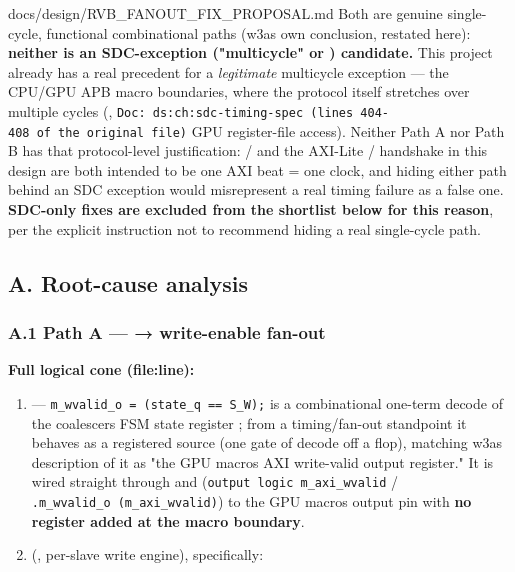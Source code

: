 \begin{relocated}{docs/design/RVB_FANOUT_FIX_PROPOSAL.md}
Both are genuine single-cycle, functional combinational paths
(w3a\textquotesingle s own conclusion, restated here): \textbf{neither
is an SDC-exception ("multicycle" or ) candidate.} This
project already has a real precedent for a \emph{legitimate} multicycle
exception --- the CPU/GPU APB macro boundaries, where the protocol
itself stretches  over multiple cycles
(,
\texttt{Doc:\allowbreak{}\ ds:\allowbreak{}ch:\allowbreak{}sdc-\allowbreak{}timing-\allowbreak{}spec\ (lines\ 404-\allowbreak{}408\ of\ the\ original\ file)}
GPU register-file access). Neither Path A nor Path B has that
protocol-level justification: / and the
AXI-Lite / handshake in this design are both
intended to be one AXI beat = one clock, and hiding either path behind
an SDC exception would misrepresent a real timing failure as a false
one. \textbf{SDC-only fixes are excluded from the shortlist below for
this reason}, per the explicit instruction not to recommend hiding a
real single-cycle path.

\subsection{A. Root-cause analysis}\label{tm:pd:rvb-fanout-fix:a-root-cause-analysis}

\subsubsection{\texorpdfstring{A.1 Path A --- 
→  write-enable
fan-out}{A.1 Path A ---  →  write-enable fan-out}}\label{tm:pd:rvb-fanout-fix:a1-path-a-u-gpum-axi-wvalid-sram-controller-write-enable-fan-out}

\textbf{Full logical cone (file:line):}

\begin{enumerate}
\def\labelenumi{\arabic{enumi}.}
\item
   ---
  \texttt{m\_\allowbreak{}wvalid\_\allowbreak{}o\ =\allowbreak{}\ (state\_\allowbreak{}q\ =\allowbreak{}=\allowbreak{}\ S\_\allowbreak{}W);}
   is a combinational one-term decode of the
  coalescer\textquotesingle s FSM state register ; from a
  timing/\allowbreak{}fan-out standpoint it behaves as a registered
  source (one gate of decode off a flop), matching w3a\textquotesingle s
  description of it as "the GPU macro\textquotesingle s AXI write-valid
  output register." It is wired straight through
   and 
  (\texttt{output\ logic\ m\_\allowbreak{}axi\_\allowbreak{}wvalid} /
  \texttt{.\allowbreak{}m\_\allowbreak{}wvalid\_\allowbreak{}o\ (m\_\allowbreak{}axi\_\allowbreak{}wvalid)})
  to the GPU macro\textquotesingle s  output pin with
  \textbf{no register added at the macro boundary}.
\item
   (, per-slave
  write engine), specifically:


\end{enumerate}
\end{relocated}
